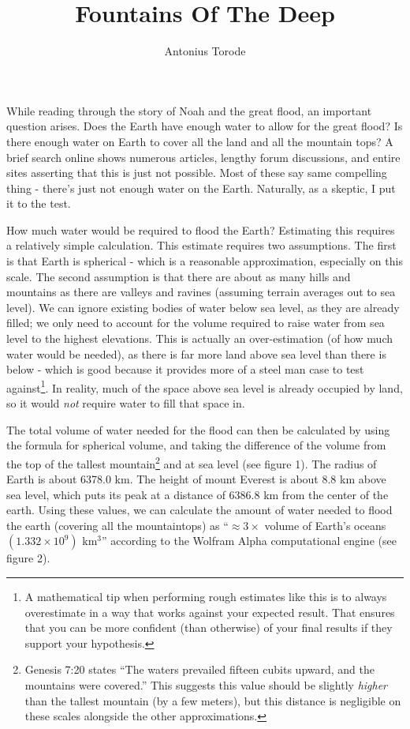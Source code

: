 \documentclass[10pt]{article}
\title{Fountains Of The Deep}
\author{Antonius Torode}
\begin{document}
\maketitle
\thispagestyle{fancy}

\begin{multicols}{2}

While reading through the story of Noah and the great flood, an important question arises. Does the Earth have enough water to allow for the great flood? Is there enough water on Earth to cover all the land and all the mountain tops? A brief search online shows numerous articles, lengthy forum discussions, and entire sites asserting that this is just not possible. Most of these say same compelling thing - there's just not enough water on the Earth. Naturally, as a skeptic, I put it to the test.

How much water would be required to flood the Earth? Estimating this requires a relatively simple calculation. This estimate requires two assumptions. The first is that Earth is spherical - which is a reasonable approximation, especially on this scale. The second assumption is that there are about as many hills and mountains as there are valleys and ravines (assuming terrain averages out to sea level). We can ignore existing bodies of water below sea level, as they are already filled; we only need to account for the volume required to raise water from sea level to the highest elevations. This is actually an over-estimation (of how much water would be needed), as there is far more land above sea level than there is below - which is good because it provides more of a steel man case to test against\footnote{A mathematical tip when performing rough estimates like this is to always overestimate in a way that works against your expected result. That ensures that you can be more confident (than otherwise) of your final results if they support your hypothesis.}. In reality, much of the space above sea level is already occupied by land, so it would \textit{not} require water to fill that space in.

The total volume of water needed for the flood can then be calculated by using the formula for spherical volume, and taking the difference of the volume from the top of the tallest mountain\footnote{Genesis 7:20 states ``The waters prevailed fifteen cubits upward, and the mountains were covered.'' This suggests this value should be slightly \textit{higher} than the tallest mountain (by a few meters), but this distance is negligible on these scales alongside the other approximations.} and at sea level (see figure 1). The radius of Earth is about 6378.0 km. The height of mount Everest is about 8.8 km above sea level, which puts its peak at a distance of 6386.8 km from the center of the earth. Using these values, we can calculate the amount of water needed to flood the earth (covering all the mountaintops) as ``$\approx 3 \times $ volume of Earth's oceans $(1.332 \times 10^9)$ km$^3$'' according to the Wolfram Alpha computational engine (see figure 2).



\end{multicols}
\end{document}
